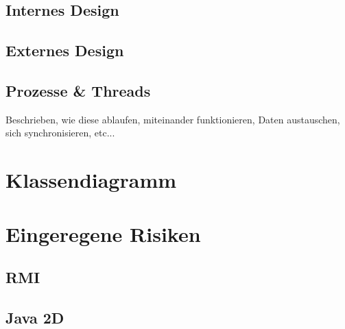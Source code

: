 \documentclass[a4paper,12pt,halfparskip,DIV14]{scrartcl}
\begin{document}
\subsection{Internes Design}\label{sub:internes_design} %


\subsection{Externes Design}\label{sub:externes_design} %


\subsection{Prozesse \& Threads} %
\label{sub:prozesse_threads}
Beschrieben, wie diese ablaufen, miteinander funktionieren, Daten austauschen, sich synchronisieren, etc...


\section{Klassendiagramm} %
\label{sec:klassendiagramm}


\section{Eingeregene Risiken} %
\label{sec:risiken}

\subsection{RMI} %
\label{sub:rmi}


\subsection{Java 2D} %
\label{sub:java_2d}


\end{document}
